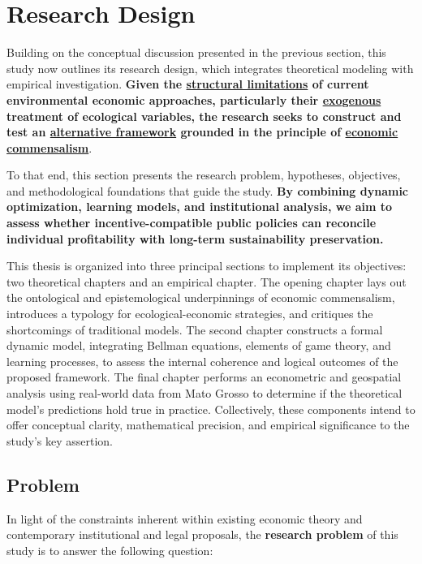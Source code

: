 
\section{Research Design}

Building on the conceptual discussion presented in the previous section, this study now outlines its research design, which integrates theoretical modeling with empirical investigation. \textbf{Given the \underline{structural limitations} of current environmental economic approaches, particularly their \underline{exogenous} treatment of ecological variables, the research seeks to construct and test an \underline{alternative framework} grounded in the principle of \underline{economic commensalism}}.

To that end, this section presents the research problem, hypotheses, objectives, and methodological foundations that guide the study. \textbf{By combining dynamic optimization, learning models, and institutional analysis, we aim to assess whether incentive-compatible public policies can reconcile individual profitability with long-term sustainability preservation.}

This thesis is organized into three principal sections to implement its objectives: two theoretical chapters and an empirical chapter. The opening chapter lays out the ontological and epistemological underpinnings of economic commensalism, introduces a typology for ecological-economic strategies, and critiques the shortcomings of traditional models. The second chapter constructs a formal dynamic model, integrating Bellman equations, elements of game theory, and learning processes, to assess the internal coherence and logical outcomes of the proposed framework. The final chapter performs an econometric and geospatial analysis using real-world data from Mato Grosso to determine if the theoretical model's predictions hold true in practice. Collectively, these components intend to offer conceptual clarity, mathematical precision, and empirical significance to the study's key assertion.

\subsection{Problem}

In light of the constraints inherent within existing economic theory and contemporary institutional and legal proposals, the \textbf{research problem} of this study is to answer the following question: 
\vspace{1em}

